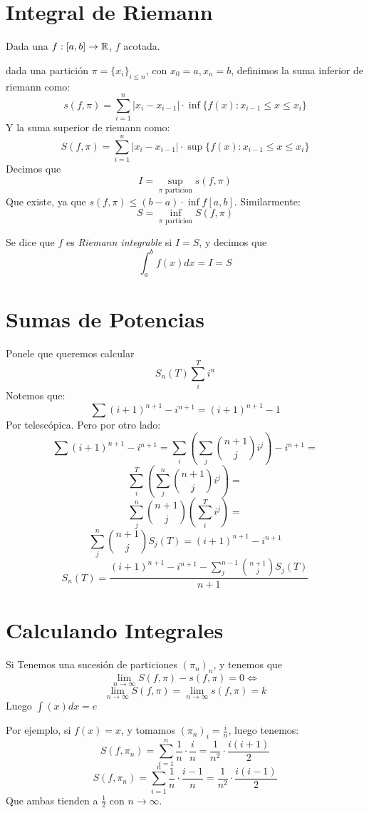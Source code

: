\documentclass{article}
\begin{document}
	\section*{Integral de Riemann}
	Dada una $f : [a,b] \to \mathbb{R}$, $f$ acotada.

	dada una partición $\pi = \{x_i\}_{i \leq n}$, con $x_0 = a, x_n = b$, definimos la suma inferior de riemann como:
	\[
		s(f, \pi) = \sum_{i = 1}^n |x_i - x_{i-1}| \cdot \inf \{f(x) : x_{i-1} \leq x \leq x_i \}
	\]
	Y la suma superior de riemann como:
	\[
		S(f, \pi) = \sum_{i = 1}^n |x_i - x_{i-1}| \cdot \sup \{f(x) : x_{i-1} \leq x \leq x_i \}
	\]
	Decimos que
	\[I = \sup_{\pi \text{ particion}} s(f, \pi)\]
	Que existe, ya que $s(f, \pi) \leq (b-a) \cdot \inf f [a,b]$. Similarmente:
	\[S = \inf_{\pi \text{ particion}} S(f, \pi)\]

	Se dice que $f$ es \emph{Riemann integrable} si $I = S$, y decimos que
	\[\int_a^b f(x) dx = I = S\]

	\section*{Sumas de Potencias}
	Ponele que queremos calcular
	\[S_n(T) \sum_i^T i^n\]
	Notemos que:
	\[
		\sum (i+1)^{n+1} - i^{n+1} = (i+1)^{n+1} - 1
	\]
	Por telescópica. Pero por otro lado:
	\[
		\sum (i+1)^{n+1} - i^{n+1} =
		\sum_i \left( \sum_j {n+1 \choose j} i^j \right) - i ^{n+1} =
	\]
	\[
		\sum_i^T \left( \sum_j^n {n+1 \choose j} i^j \right) =
	\]
	\[
		\sum_j^n {n+1 \choose j} \left( \sum_i^T i^j \right) =
	\]
	\[
		\sum_j^n {n+1 \choose j} S_j(T) = (i+1)^{n+1} - i^{n+1}
	\]
	\[
		S_n(T) = \frac{(i+1)^{n+1} - i^{n+1} - \sum_j^{n-1} {n+1 \choose j} S_j(T)}{n+1}
	\]

	\section*{Calculando Integrales}
	Si Tenemos una sucesión de particiones $(\pi_n)_n$, y tenemos que
	\[\lim_{n \to \infty} S(f, \pi) - s(f,\pi) = 0 \iff\]
	\[\lim_{n \to \infty} S(f, \pi) = \lim_{n \to \infty}s(f,\pi) = k\]
	Luego $\int (x) dx = e$

	Por ejemplo, si $f(x) = x$, y tomamos $(\pi_n)_i = \frac{i}{n}$, luego tenemos:
	\[
		S(f, \pi_n) = \sum_{i = 1}^n \frac{1}{n} \cdot \frac{i}{n} = \frac{1}{n^2} \cdot \frac{i(i+1)}{2}
	\]
	\[
		S(f, \pi_n) = \sum_{i = 1}^n \frac{1}{n} \cdot \frac{i-1}{n} = \frac{1}{n^2} \cdot \frac{i(i-1)}{2}
	\]
	Que ambas tienden a $\frac{1}{2}$ con $n \to \infty$.
\end{document}
